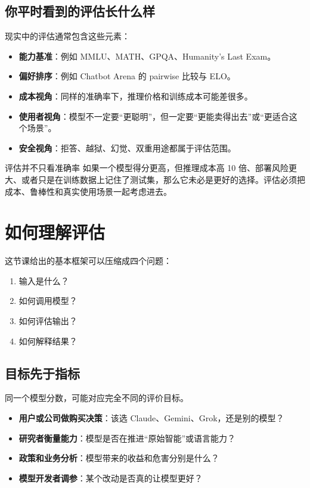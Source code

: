 \documentclass[a4paper]{article}
\begin{document}
\subsection{你平时看到的评估长什么样}

现实中的评估通常包含这些元素：

\begin{itemize}
    \item \textbf{能力基准}：例如 MMLU、MATH、GPQA、Humanity's Last Exam。
    \item \textbf{偏好排序}：例如 Chatbot Arena 的 pairwise 比较与 ELO。
    \item \textbf{成本视角}：同样的准确率下，推理价格和训练成本可能差很多。
    \item \textbf{使用者视角}：模型不一定要``更聪明''，但一定要``更能卖得出去''或``更适合这个场景''。
    \item \textbf{安全视角}：拒答、越狱、幻觉、双重用途都属于评估范围。
\end{itemize}

\begin{knowledgebox}{评估并不只看准确率}
如果一个模型得分更高，但推理成本高 10 倍、部署风险更大、或者只是在训练数据上记住了测试集，那么它未必是更好的选择。评估必须把成本、鲁棒性和真实使用场景一起考虑进去。
\end{knowledgebox}

\section{如何理解评估}

这节课给出的基本框架可以压缩成四个问题：

\begin{enumerate}
    \item 输入是什么？
    \item 如何调用模型？
    \item 如何评估输出？
    \item 如何解释结果？
\end{enumerate}

\subsection{目标先于指标}

同一个模型分数，可能对应完全不同的评价目标。

\begin{itemize}
    \item \textbf{用户或公司做购买决策}：该选 Claude、Gemini、Grok，还是别的模型？
    \item \textbf{研究者衡量能力}：模型是否在推进``原始智能''或语言能力？
    \item \textbf{政策和业务分析}：模型带来的收益和危害分别是什么？
    \item \textbf{模型开发者调参}：某个改动是否真的让模型更好？
\end{itemize}
\end{document}
